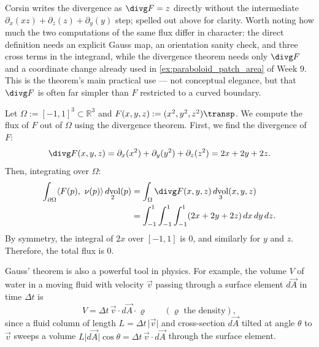 \begin{ainote}
Corsin writes the divergence as $\divg F = z$ directly without the intermediate
$\partial_x(xz)+\partial_z(z)+\partial_y(y)$ step; spelled out above for clarity. Worth
noting how much the two computations of the same flux differ in character: the direct
definition needs an explicit Gauss map, an orientation sanity check, and three cross terms
in the integrand, while the divergence theorem needs only $\divg F$ and a coordinate change
already used in \cref{ex:paraboloid_patch_area} of Week 9. This is the theorem's main
practical use --- not conceptual elegance, but that $\divg F$ is often far simpler than $F$
restricted to a curved boundary.
\end{ainote}

\begin{example}
\label{ex:flux_divergence_cube}
Let $\Omega := [-1,1]^3 \subset \mathbb{R}^3$ and $F(x,y,z) := (x^2, y^2, z^2)\transp$.
We compute the flux of $F$ out of $\Omega$ using the divergence theorem.
First, we find the divergence of $F$:
\[\divg F(x,y,z) = \partial_x(x^2) + \partial_y(y^2) + \partial_z(z^2) = 2x + 2y + 2z.\]
Then, integrating over $\Omega$:
\begin{align*}
\int_{\partial\Omega} \langle F(p),\ \nu(p)\rangle \mathop{d\text{vol}}_2(p) &= \int_\Omega \divg F(x,y,z) \mathop{d\text{vol}}_3(x,y,z) \\
&= \int_{-1}^1 \int_{-1}^1 \int_{-1}^1 (2x + 2y + 2z) \,dx\,dy\,dz.
\end{align*}
By symmetry, the integral of $2x$ over $[-1,1]$ is $0$, and similarly for $y$ and $z$. Therefore, the total flux is $0$.
\end{example}

Gauss' theorem is also a powerful tool in physics. For example, the volume $V$ of water in a
moving fluid with velocity $\vec v$ passing through a surface element $d\vec A$ in time
$\Delta t$ is
\[V = \Delta t\,\vec v\cdot d\vec A\cdot\varrho \qquad (\varrho \text{ the density}),\]
since a fluid column of length $L = \Delta t\,\lvert\vec v\rvert$ and cross-section $d\vec A$
tilted at angle $\theta$ to $\vec v$ sweeps a volume $L\lvert d\vec A\rvert\cos\theta =
\Delta t\,\vec v\cdot d\vec A$ through the surface element.

